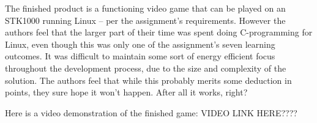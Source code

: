 The finished product is a functioning video game that can be played on an STK1000 running Linux -- per the assignment's requirements.
However the authors feel that the larger part of their time was spent doing C-programming for Linux, even though this was only one of the assignment's seven learning outcomes.
It was difficult to maintain some sort of energy efficient focus throughout the development process, due to the size and complexity of the solution.
The authors feel that while this probably merits some deduction in points, they sure hope it won't happen.
After all it works, right?


Here is a video demonstration of the finished game: VIDEO LINK HERE????
